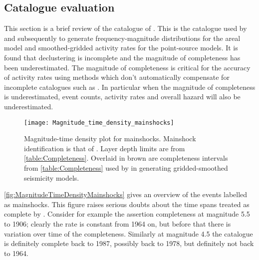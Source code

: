 \documentclass{article}
\begin{document}
\begin{appendices}
\section{Catalogue evaluation}
\label{app:Catalogue}

This section is a brief review of the catalogue of \cite{nath2010earthquake}.
This is the catalogue used by \cite{thingbaijam2011seismogenic} and subsequently \cite{nath2012probabilistic} to generate frequency-magnitude distributions for the areal model and smoothed-gridded activity rates for the point-source models.
It is found that declustering is incomplete and the magnitude of completeness has been underestimated.
The magnitude of completeness is critical for the accuracy of activity rates using methods which don't automatically compensate for incomplete catalogues such as \cite{frankel1995mapping}.
In particular when the magnitude of completeness is underestimated, event counts, activity rates and overall hazard will also be underestimated.

\begin{figure}
\begin{adjustbox}{center}
\texttt{[image: Magnitude\_time\_density\_mainshocks]}
\end{adjustbox}
\caption[Magnitude-time density plot for mainshocks]{%
Magnitude-time density plot for mainshocks.
Mainshock identification is that of \cite{nath2010earthquake}.
Layer depth limits are from \autoref{table:Completeness}.
Overlaid in brown are completeness intervals from \autoref{table:Completeness} used by \cite{nath2012probabilistic} in generating gridded-smoothed seismicity models.}
\label{fig:MagnitudeTimeDensityMainshocks}
\end{figure}

\autoref{fig:MagnitudeTimeDensityMainshocks} gives an overview of the events labelled as mainshocks.
This figure raises serious doubts about the time spans treated as complete by \cite{thingbaijam2011seismogenic}.
Consider for example the assertion completeness at magnitude 5.5 to 1906; clearly the rate is constant from 1964 on, but before that there is variation over time of the completeness.
Similarly at magnitude 4.5 the catalogue is definitely complete back to 1987, possibly back to 1978, but definitely not back to 1964.


\end{appendices}
\end{document}
